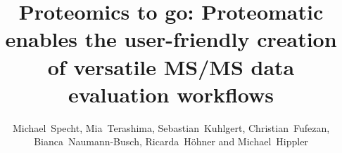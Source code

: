 \documentclass{bioinfo}
\begin{document}

\renewcommand{\thefootnote}{\fnsymbol{footnote}}

\title[Proteomatic -- a platform for MS/MS data evaluation]
{Proteomics to go: Proteomatic enables the user-friendly creation of versatile MS/MS data evaluation workflows}
\author[Michael Specht \textit{et~al.}]
{Michael~Specht\footnotemark[1], 
Mia~Terashima, 
Sebastian~Kuhlgert,
Christian~Fufezan,
Bianca~Naumann-Busch,
Ricarda~H\"ohner and
Michael~Hippler
}
\address{Institute of Plant Biology and Biotechnology, University of 
M\"unster, Germany}



\maketitle


\renewcommand{\thefootnote}{\arabic{footnote}}
\end{document}
